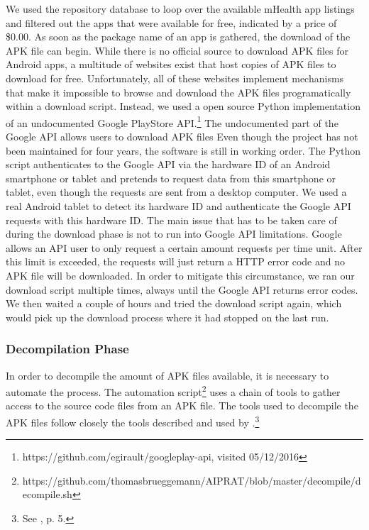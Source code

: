 We used the repository database to loop over the available mHealth app listings and filtered out the apps that were available for free, indicated by a price of \$0.00.
As soon as the package name of an app is gathered, the download of the \acs{APK} file can begin. 
While there is no official source to download \acs{APK} files for Android apps, a multitude of websites exist that host copies of \acs{APK} files to download for free.
Unfortunately, all of these websites implement mechanisms that make it impossible to browse and download the APK files programatically within a download script.
Instead, we used a open source Python implementation of an undocumented Google PlayStore \acs{API}.\footnote{https://github.com/egirault/googleplay-api, visited 05/12/2016} 
The undocumented part of the Google API allows users to download APK files 
Even though the project has not been maintained for four years, the software is still in working order.
The Python script authenticates to the Google API via the hardware ID of an Android smartphone or tablet and pretends to request data from this smartphone or tablet, even though the requests are sent from a desktop computer.
We used a real Android tablet to detect its hardware ID and authenticate the Google API requests with this hardware ID.
The main issue that has to be taken care of during the download phase is not to run into Google API limitations. 
Google allows an API user to only request a certain amount requests per time unit. 
After this limit is exceeded, the requests will just return a HTTP error code and no APK file will be downloaded.
In order to mitigate this circumstance, we ran our download script multiple times, always until the Google API returns error codes. 
We then waited a couple of hours and tried the download script again, which would pick up the download process where it had stopped on the last run.

\subsubsection{Decompilation Phase}

In order to decompile the amount of APK files available, it is necessary to automate the process. 
The automation script\footnote{https://github.com/thomasbrueggemann/AIPRAT/blob/master/decompile/decompile.sh} uses a chain of tools to gather access to the source code files from an APK file.
The tools used to decompile the APK files follow closely the tools described and used by \cite{Enck2011}.\footnote{See \cite{Enck2011}, p. 5.}

